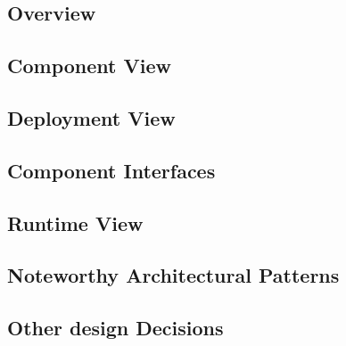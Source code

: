 \subsection{Overview}
\subsection{Component View}
\subsection{Deployment View}
\subsection{Component Interfaces}
\subsection{Runtime View}
\subsection{Noteworthy Architectural Patterns}
\subsection{Other design Decisions}